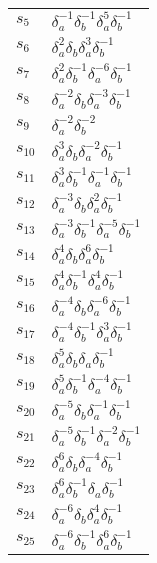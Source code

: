 \documentclass{article}
\begin{document}
\begin{center}
\begin{tabular}{ll}
$s_{5}$ & $\delta_a^{-1}\delta_b^{-1}\delta_a^{5}\delta_b^{-1}$ \\
$s_{6}$ & $\delta_a^{2}\delta_b^{}\delta_a^{3}\delta_b^{-1}$ \\
$s_{7}$ & $\delta_a^{2}\delta_b^{-1}\delta_a^{-6}\delta_b^{-1}$ \\
$s_{8}$ & $\delta_a^{-2}\delta_b^{}\delta_a^{-3}\delta_b^{-1}$ \\
$s_{9}$ & $\delta_a^{-2}\delta_b^{-2}$ \\
$s_{10}$ & $\delta_a^{3}\delta_b^{}\delta_a^{-2}\delta_b^{-1}$ \\
$s_{11}$ & $\delta_a^{3}\delta_b^{-1}\delta_a^{-1}\delta_b^{-1}$ \\
$s_{12}$ & $\delta_a^{-3}\delta_b^{}\delta_a^{2}\delta_b^{-1}$ \\
$s_{13}$ & $\delta_a^{-3}\delta_b^{-1}\delta_a^{-5}\delta_b^{-1}$ \\
$s_{14}$ & $\delta_a^{4}\delta_b^{}\delta_a^{6}\delta_b^{-1}$ \\
$s_{15}$ & $\delta_a^{4}\delta_b^{-1}\delta_a^{4}\delta_b^{-1}$ \\
$s_{16}$ & $\delta_a^{-4}\delta_b^{}\delta_a^{-6}\delta_b^{-1}$ \\
$s_{17}$ & $\delta_a^{-4}\delta_b^{-1}\delta_a^{3}\delta_b^{-1}$ \\
$s_{18}$ & $\delta_a^{5}\delta_b^{}\delta_a^{}\delta_b^{-1}$ \\
$s_{19}$ & $\delta_a^{5}\delta_b^{-1}\delta_a^{-4}\delta_b^{-1}$ \\
$s_{20}$ & $\delta_a^{-5}\delta_b^{}\delta_a^{-1}\delta_b^{-1}$ \\
$s_{21}$ & $\delta_a^{-5}\delta_b^{-1}\delta_a^{-2}\delta_b^{-1}$ \\
$s_{22}$ & $\delta_a^{6}\delta_b^{}\delta_a^{-4}\delta_b^{-1}$ \\
$s_{23}$ & $\delta_a^{6}\delta_b^{-1}\delta_a^{}\delta_b^{-1}$ \\
$s_{24}$ & $\delta_a^{-6}\delta_b^{}\delta_a^{4}\delta_b^{-1}$ \\
$s_{25}$ & $\delta_a^{-6}\delta_b^{-1}\delta_a^{6}\delta_b^{-1}$ \\
\bottomrule
\end{tabular}
\end{center}

\thispagestyle{empty}
\end{document}
